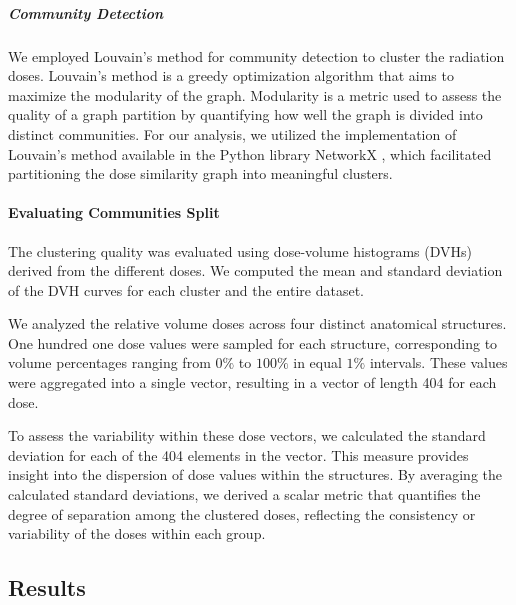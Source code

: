 \subparagraph{Community Detection}
\label{clustering_evaluation}
We employed Louvain's method for community detection to cluster the radiation doses.
Louvain's method is a greedy optimization algorithm that aims to maximize the modularity of the graph.
Modularity is a metric used to assess the quality of a graph partition by quantifying how well the graph is divided into distinct communities.
For our analysis, we utilized the implementation of Louvain's method available in the Python library NetworkX \cite{NetworkX}, which facilitated partitioning the dose similarity graph into meaningful clusters.

\paragraph{Evaluating Communities Split}
The clustering quality was evaluated using dose-volume histograms (DVHs) derived from the different doses.
We computed the mean and standard deviation of the DVH curves for each cluster and the entire dataset.

We analyzed the relative volume doses across four distinct anatomical structures.
One hundred one dose values were sampled for each structure, corresponding to volume percentages ranging from $0\%$ to $100\%$ in equal $1\%$ intervals.
These values were aggregated into a single vector, resulting in a vector of length 404 for each dose.

To assess the variability within these dose vectors, we calculated the standard deviation for each of the 404 elements in the vector.
This measure provides insight into the dispersion of dose values within the structures.
By averaging the calculated standard deviations, we derived a scalar metric that quantifies the degree of separation among the clustered doses, reflecting the consistency or variability of the doses within each group.

\subsection{Results}
